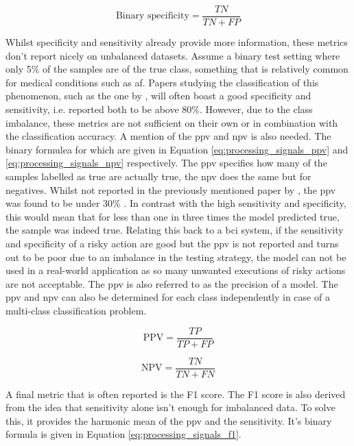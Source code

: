 \begin{equation}
    \text{Binary specificity} = \frac{TN}{TN + FP}
    \label{eq:processing_signals_specificity}
\end{equation}

Whilst specificity and sensitivity already provide more information, these metrics don't report nicely on unbalanced datasets.
Assume a binary test setting where only 5\% of the samples are of the true class, something that is relatively common for medical conditions such as \gls{af}.
Papers studying the classification of this phenomenon, such as the one by \citet{attia}, will often boast a good specificity and sensitivity, i.e. \citet{attia} reported both to be above 80\%.
However, due to the class imbalance, these metrics are not sufficient on their own or in combination with the classification accuracy.
A mention of the \gls{ppv} and \gls{npv} is also needed.
The binary formulea for which are given in Equation \ref{eq:processing_signals_ppv} and \ref{eq:processing_signals_npv} respectively. 
The \gls{ppv} specifies how many of the samples labelled as true are actually true, the \gls{npv} does the same but for negatives.
Whilst not reported in the previously mentioned paper by \citet{attia}, the \gls{ppv} was found to be under 30\% \citep{ppv_attia}.
In contrast with the high sensitivity and specificity, this would mean that for less than one in three times the model predicted true, the sample was indeed true.
Relating this back to a \gls{bci} system, if the sensitivity and specificity of a risky action are good but the \gls{ppv} is not reported and turns out to be poor due to an imbalance in the testing strategy, the model can not be used in a real-world application as so many unwanted executions of risky actions are not acceptable.
The \gls{ppv} is also referred to as the precision of a model.
The \gls{ppv} and \gls{npv} can also be determined for each class independently in case of a multi-class classification problem.

\begin{equation} %
    \text{PPV} = \frac{TP}{TP + FP}
    \label{eq:processing_signals_ppv}
\end{equation}

\begin{equation}
    \text{NPV} = \frac{TN}{TN + FN}
    \label{eq:processing_signals_npv}
\end{equation}

A final metric that is often reported is the F1 score.
The F1 score is also derived from the idea that sensitivity alone isn't enough for imbalanced data.
To solve this, it provides the harmonic mean of the \gls{ppv} and the sensitivity.
It's binary formula is given in Equation \ref{eq:processing_signals_f1}. 

